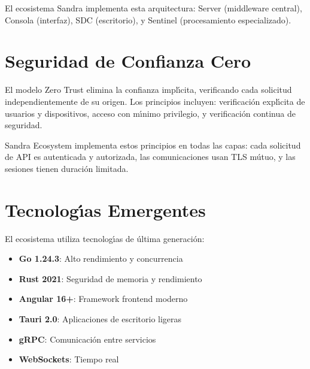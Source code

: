 El ecosistema Sandra implementa esta arquitectura: Server (middleware central), Consola (interfaz), SDC (escritorio), y Sentinel (procesamiento especializado).

\section{Seguridad de Confianza Cero}

El modelo Zero Trust elimina la confianza impl\'{\i}cita, verificando cada solicitud independientemente de su origen. Los principios incluyen: verificaci\'on expl\'{\i}cita de usuarios y dispositivos, acceso con m\'{\i}nimo privilegio, y verificaci\'on continua de seguridad.

Sandra Ecosystem implementa estos principios en todas las capas: cada solicitud de API es autenticada y autorizada, las comunicaciones usan TLS m\'utuo, y las sesiones tienen duraci\'on limitada.

\section{Tecnolog\'{\i}as Emergentes}

El ecosistema utiliza tecnolog\'{\i}as de \'ultima generaci\'on:
\begin{itemize}
\item \textbf{Go 1.24.3}: Alto rendimiento y concurrencia
\item \textbf{Rust 2021}: Seguridad de memoria y rendimiento
\item \textbf{Angular 16+}: Framework frontend moderno
\item \textbf{Tauri 2.0}: Aplicaciones de escritorio ligeras
\item \textbf{gRPC}: Comunicaci\'on entre servicios
\item \textbf{WebSockets}: Tiempo real
\end{itemize}

\newpage
